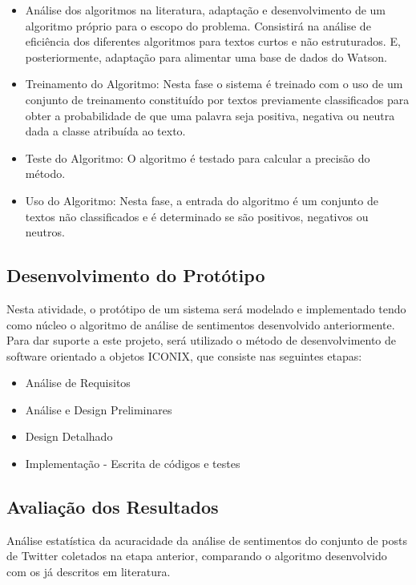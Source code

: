 \documentclass[
	12pt,				%
	openright,			%
	oneside,			%
	a4paper,			%
	english,			%
	spanish,			%
	brazil				%
	]{abntex2}
\begin{document}
				\begin{itemize}
					\item Análise dos algoritmos na literatura, adaptação e desenvolvimento de um algoritmo próprio para o escopo do problema.	Consistirá na análise de eficiência dos diferentes algoritmos para textos curtos e não estruturados. E, posteriormente, adaptação para alimentar uma base de dados do Watson.

					\item Treinamento do Algoritmo: Nesta fase o sistema é treinado com o uso de um conjunto de treinamento constituído por textos previamente classificados para obter a probabilidade de que uma palavra seja positiva, negativa ou neutra dada a classe atribuída ao texto.
					\item Teste do Algoritmo: O algoritmo é testado para calcular a precisão do método.
					\item Uso do Algoritmo: Nesta fase, a entrada do algoritmo é um conjunto de textos não classificados e é determinado se são positivos, negativos ou neutros.
				\end{itemize}
				
		\subsection*{Desenvolvimento do Protótipo}
		
		Nesta atividade, o protótipo de um sistema será modelado e implementado tendo como núcleo o algoritmo de análise de sentimentos desenvolvido anteriormente. Para dar suporte a este projeto, será utilizado o método de desenvolvimento de software orientado a objetos ICONIX, que consiste nas seguintes etapas: 
		
				\begin{itemize}
					\item Análise de Requisitos
					\item Análise e Design Preliminares
					\item Design Detalhado
					\item Implementação - Escrita de códigos e testes 
					
				\end{itemize}
				
				
		\subsection*{Avaliação dos Resultados}
		Análise estatística da acuracidade da análise de sentimentos do conjunto de posts de Twitter coletados na etapa anterior, comparando o algoritmo desenvolvido com os já descritos em literatura.
		
\end{document}
